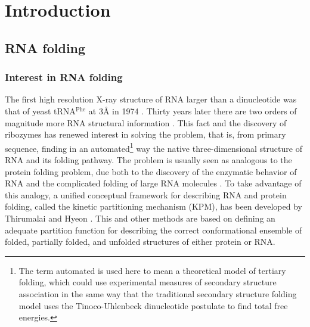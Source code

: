 \chapter{Introduction}
\label{introduction} 

\section{RNA folding}
\subsection{Interest in RNA folding}
The first high resolution X-ray structure of RNA larger than a
dinucleotide was that of yeast tRNA$^{\textrm{Phe}}$ at 3{\AA}  in
1974 \cite{robertus1974, kim1974}. Thirty years later there are two
orders of magnitude more RNA structural information
\cite{noller2005}. This fact and the discovery of ribozymes
\cite{kruger1982, takada1983} has renewed interest in solving the
 problem, that is, from primary sequence, finding in an
automated\footnote{The term automated is used here to mean a
theoretical model of tertiary folding, which could use experimental
measures of secondary structure association in the same way that the
traditional secondary structure folding model \cite{zuker1989,
  hofacker1994} uses the Tinoco-Uhlenbeck dinucleotide postulate
\cite{borer1974} to find total free energies.} way the native
three-dimensional structure of RNA and its
folding pathway. The  problem is usually seen as
analogous to the protein folding problem, due both to the discovery
of the enzymatic behavior of RNA \cite{kruger1982, takada1983} and
the complicated folding of large RNA molecules \cite{batey1999}. To
take advantage of this analogy, a unified conceptual framework for
describing RNA and protein folding, called the kinetic partitioning
mechanism (KPM), has been developed by Thirumalai and Hyeon
\cite{thirumalai2005}. This and other methods are based on defining
an adequate partition function for describing the correct
conformational ensemble of folded, partially folded, and unfolded
structures \cite{chen1995, chen1998, thirumalai1996} of either
protein or RNA.

